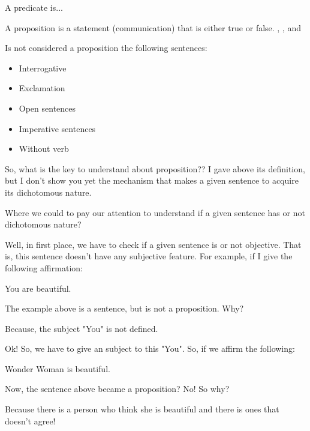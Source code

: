 \begin{definition}[Predicate]
    A predicate is...
\end{definition}

\begin{definition}[Proposition]
A proposition is a statement (communication) that is either true or false. \cite{ericlehman}, \cite{judithlgersting}, \cite{raymoundmsmullyan} and \cite{whiteheadandrussell}
\end{definition}

Is not considered a proposition the following sentences:

\begin{itemize}
    \item Interrogative
    \item Exclamation
    \item Open sentences
    \item Imperative sentences
    \item Without verb
\end{itemize}

So, what is the key to understand about proposition?? I gave above its definition, but I don't show you yet the mechanism that makes a given sentence to acquire its dichotomous nature.

Where we could to pay our attention to understand if a given sentence has or not dichotomous nature?

Well, in first place, we have to check if a given sentence is or not objective. That is, this sentence doesn't have any subjective feature. For example, if I give the following affirmation:

\begin{example}\label{exemplo1}
    You are beautiful.
\end{example}

The example above is a sentence, but is not a proposition. Why?

Because, the subject "You" is not defined.

Ok! So, we have to give an subject to this "You". So, if we affirm the following:

\begin{example}
    Wonder Woman is beautiful.
\end{example}

Now, the sentence above became a proposition? No! So why?

Because there is a person who think she is beautiful and there is ones that doesn't agree!

